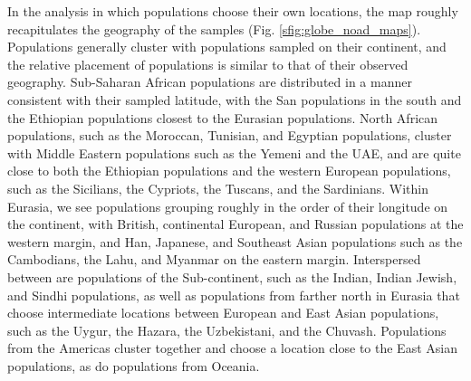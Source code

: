 \documentclass[12pt]{article}
\begin{document}
In the analysis in which populations choose their own locations, the map roughly recapitulates the geography of the samples (Fig. \ref{sfig:globe_noad_maps}).  Populations generally cluster with populations sampled on their continent, and the relative placement of populations is similar to that of their observed geography.  Sub-Saharan African populations are distributed in a manner consistent with their sampled latitude, with the San populations in the south and the Ethiopian populations closest to the Eurasian populations.  North African populations, such as the Moroccan, Tunisian, and Egyptian populations, cluster with Middle Eastern populations such as the Yemeni and the UAE, and are quite close to both the Ethiopian populations and the western European populations, such as the Sicilians, the Cypriots, the Tuscans, and the Sardinians.  Within Eurasia, we see populations grouping roughly in the order of their longitude on the continent, with British, continental European, and Russian populations at the western margin, and Han, Japanese, and Southeast Asian populations such as the Cambodians, the Lahu, and Myanmar on the eastern margin.  Interspersed between are populations of the Sub-continent, such as the Indian, Indian Jewish, and Sindhi populations, as well as populations from farther north in Eurasia that choose intermediate locations between European and East Asian populations, such as the Uygur, the Hazara, the Uzbekistani, and the Chuvash.  Populations from the Americas cluster together and choose a location close to the East Asian populations, as do populations from Oceania.
\end{document}
